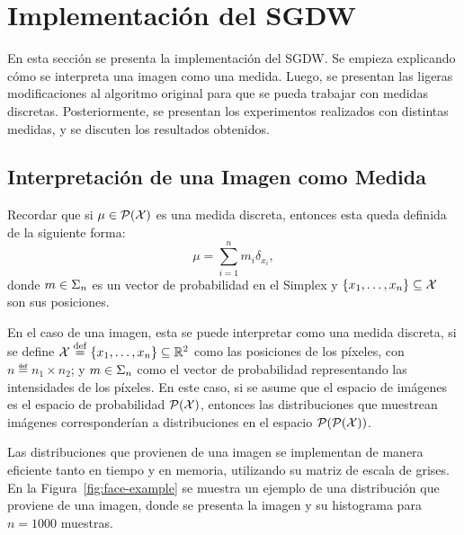 \section{Implementación del SGDW}\label{sec:sgdw}  %


En esta sección se presenta la implementación del SGDW. Se empieza explicando cómo se interpreta una imagen como una medida. Luego, se presentan las ligeras modificaciones al algoritmo original para que se pueda trabajar con medidas discretas. Posteriormente, se presentan los experimentos realizados con distintas medidas, y se discuten los resultados obtenidos.

\subsection{Interpretación de una Imagen como Medida}\label{ssec:interpr-imagen-medida}  %

Recordar que si $\mu\in \ProbSpace[\cX] $ es una medida discreta, entonces esta queda definida de la siguiente forma:
\begin{equation}\label{eq:medida-discreta}
    \mu = \sum_{i=1}^{n} m_i \delta_{x_i},
\end{equation}
donde $m \in \Simplex[n]$ es un vector de probabilidad en el Simplex y $ \left\{ x_1, \dots, x_n \right\} \subseteq \cX $ son sus posiciones.

En el caso de una imagen, esta se puede interpretar como una medida discreta, si se define $\cX \eqdef \left\{ x_1, \dots, x_n \right\} \subseteq \R^2$ como las posiciones de los píxeles, con $n \eqdef n_1 \times n_2$; y $m \in \Simplex[n]$ como el vector de probabilidad representando las intensidades de los píxeles. En este caso, si se asume que el espacio de imágenes es el espacio de probabilidad $\ProbSpace[\cX] $, entonces las distribuciones que muestrean imágenes corresponderían a distribuciones en el espacio $\ProbSpace[\ProbSpace[\cX] ] $.

Las distribuciones que provienen de una imagen se implementan de manera eficiente tanto en tiempo y en memoria, utilizando su matriz de escala de grises. En la Figura~\ref{fig:face-example} se muestra un ejemplo de una distribución que proviene de una imagen, donde se presenta la imagen y su histograma para $n=1000$ muestras.

